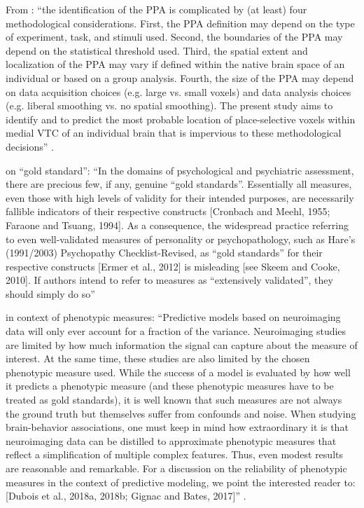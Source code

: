 %
From \citep{weiner2018defining}: ``the identification of the PPA is complicated
by (at least) four methodological considerations. First, the PPA definition may
depend on the type of experiment, task, and stimuli used. Second, the boundaries
of the PPA may depend on the statistical threshold used. Third, the spatial
extent and localization of the PPA may vary if defined within the native brain
space of an individual or based on a group analysis. Fourth, the size of the PPA
may depend on data acquisition choices (e.g. large vs. small voxels) and data
analysis choices (e.g. liberal smoothing vs. no spatial smoothing). The present
study aims to identify and to predict the most probable location of
place-selective voxels within medial VTC of an individual brain that is
impervious to these methodological decisions'' \citep{weiner2018defining}.

%
\citet{lilienfeld2015fifty} on ``gold standard'': ``In the domains of
psychological and psychiatric assessment, there are precious few, if any,
genuine ``gold standards''. Essentially all measures, even those with high
levels of validity for their intended purposes, are necessarily fallible
indicators of their respective constructs [Cronbach and Meehl, 1955; Faraone and
Tsuang, 1994]. As a consequence, the widespread practice referring to even
well-validated measures of personality or psychopathology, such as Hare’s
(1991/2003) Psychopathy Checklist-Revised, as ``gold standards'' for their
respective constructs [Ermer et al., 2012] is misleading [see Skeem and Cooke,
2010]. If authors intend to refer to measures as ``extensively validated'', they
should simply do so'' \citep{lilienfeld2015fifty}

%
\citet{scheinost2019ten} in context of phenotypic measures: ``Predictive models
based on neuroimaging data will only ever account for a fraction of the
variance. Neuroimaging studies are limited by how much information the signal
can capture about the measure of interest. At the same time, these studies are
also limited by the chosen phenotypic measure used.  While the success of a
model is evaluated by how well it predicts a phenotypic measure (and these
phenotypic measures have to be treated as gold standards), it is well known that
such measures are not always the ground truth but themselves suffer from
confounds and noise.  When studying brain-behavior associations, one must keep
in mind how extraordinary it is that neuroimaging data can be distilled to
approximate phenotypic measures that reflect a simplification of multiple
complex features. Thus, even modest results are reasonable and remarkable. For a
discussion on the reliability of phenotypic measures in the context of
predictive modeling, we point the interested reader to: [Dubois et al., 2018a,
2018b; Gignac and Bates, 2017]'' \citep{scheinost2019ten}.


